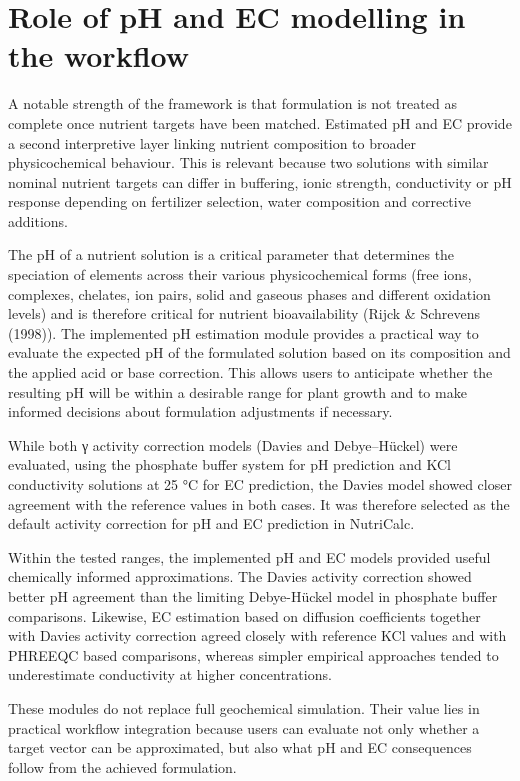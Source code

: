 \documentclass[
  letterpaper,
  DIV=11,
  numbers=noendperiod]{scrreprt}
\begin{document}
\section{Role of pH and EC modelling in the
workflow}\label{role-of-ph-and-ec-modelling-in-the-workflow}

A notable strength of the framework is that formulation is not treated
as complete once nutrient targets have been matched. Estimated pH and EC
provide a second interpretive layer linking nutrient composition to
broader physicochemical behaviour. This is relevant because two
solutions with similar nominal nutrient targets can differ in buffering,
ionic strength, conductivity or pH response depending on fertilizer
selection, water composition and corrective additions.

The pH of a nutrient solution is a critical parameter that determines
the speciation of elements across their various physicochemical forms
(free ions, complexes, chelates, ion pairs, solid and gaseous phases and
different oxidation levels) and is therefore critical for nutrient
bioavailability (Rijck \& Schrevens (1998)). The implemented pH
estimation module provides a practical way to evaluate the expected pH
of the formulated solution based on its composition and the applied acid
or base correction. This allows users to anticipate whether the
resulting pH will be within a desirable range for plant growth and to
make informed decisions about formulation adjustments if necessary.

While both γ activity correction models (Davies and Debye--Hückel) were
evaluated, using the phosphate buffer system for pH prediction and KCl
conductivity solutions at 25 °C for EC prediction, the Davies model
showed closer agreement with the reference values in both cases. It was
therefore selected as the default activity correction for pH and EC
prediction in NutriCalc.

Within the tested ranges, the implemented pH and EC models provided
useful chemically informed approximations. The Davies activity
correction showed better pH agreement than the limiting Debye-Hückel
model in phosphate buffer comparisons. Likewise, EC estimation based on
diffusion coefficients together with Davies activity correction agreed
closely with reference KCl values and with PHREEQC based comparisons,
whereas simpler empirical approaches tended to underestimate
conductivity at higher concentrations.

These modules do not replace full geochemical simulation. Their value
lies in practical workflow integration because users can evaluate not
only whether a target vector can be approximated, but also what pH and
EC consequences follow from the achieved formulation.
\end{document}
